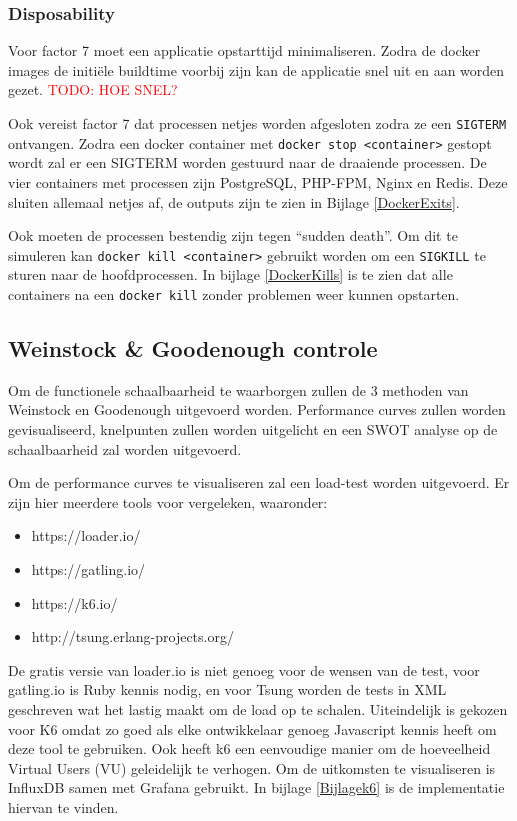 \subsubsection{Disposability}
Voor factor 7 moet een applicatie opstarttijd minimaliseren. Zodra de docker images de initiële buildtime voorbij zijn kan de applicatie snel uit en aan worden gezet. \textcolor{red}{TODO: HOE SNEL?} %

Ook vereist factor 7 dat processen netjes worden afgesloten zodra ze een \texttt{SIGTERM} ontvangen. Zodra een docker container met \texttt{docker stop <container>} gestopt wordt zal er een SIGTERM worden gestuurd naar de draaiende processen. De vier containers met processen zijn PostgreSQL, PHP-FPM, Nginx en Redis. Deze sluiten allemaal netjes af, de outputs zijn te zien in Bijlage \ref{DockerExits}.

Ook moeten de processen bestendig zijn tegen \enquote{sudden death}. Om dit te simuleren kan \texttt{docker kill <container>} gebruikt worden om een \texttt{SIGKILL} te sturen naar de hoofdprocessen. In bijlage \ref{DockerKills} is te zien dat alle containers na een \texttt{docker kill} zonder problemen weer kunnen opstarten.

\subsection{Weinstock \& Goodenough controle} \label{schaalbaarheidscontrole}
Om de functionele schaalbaarheid te waarborgen zullen de 3 methoden van Weinstock en Goodenough \parencite{OnSystemScalability} uitgevoerd worden. Performance curves zullen worden gevisualiseerd, knelpunten zullen worden uitgelicht en een SWOT analyse op de schaalbaarheid zal worden uitgevoerd.

Om de performance curves te visualiseren zal een load-test worden uitgevoerd. Er zijn hier meerdere tools voor vergeleken, waaronder:
\begin{itemize}
	\item https://loader.io/
	\item https://gatling.io/
	\item https://k6.io/
	\item http://tsung.erlang-projects.org/
\end{itemize}

De gratis versie van loader.io is niet genoeg voor de wensen van de test, voor gatling.io is Ruby kennis nodig, en voor Tsung worden de tests in XML geschreven wat het lastig maakt om de load op te schalen. Uiteindelijk is gekozen voor K6 omdat zo goed als elke ontwikkelaar genoeg Javascript kennis heeft om deze tool te gebruiken. Ook heeft k6 een eenvoudige manier om de hoeveelheid Virtual Users (VU) geleidelijk te verhogen. Om de uitkomsten te visualiseren is InfluxDB samen met Grafana gebruikt. In bijlage \ref{Bijlagek6} is de implementatie hiervan te vinden.

